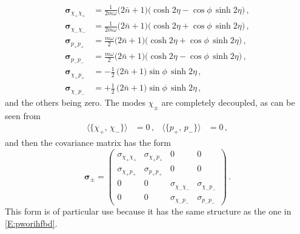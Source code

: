 \documentclass[11pt,a4paper]{article}
\begin{document}
\begin{align}
	\bm{\sigma}_{\chi_+\chi_+}&=\frac{1}{2m\omega}\bigl(2\bar{n}+1\bigr)\bigl(\cosh2\eta-\cos\phi\,\sinh2\eta\bigr)\,,\label{E:ikgbidehs1}\\
	\bm{\sigma}_{\chi_-\chi_-}&=\frac{1}{2m\omega}\bigl(2\bar{n}+1\bigr)\bigl(\cosh2\eta+\cos\phi\,\sinh2\eta\bigr)\,,\\
	\bm{\sigma}_{p_+p_+}&=\frac{m\omega}{2}\bigl(2\bar{n}+1\bigr)\bigl(\cosh2\eta+\cos\phi\,\sinh2\eta\bigr)\,,\\
	\bm{\sigma}_{p_-p_-}&=\frac{m\omega}{2}\bigl(2\bar{n}+1\bigr)\bigl(\cosh2\eta-\cos\phi\,\sinh2\eta\bigr)\,,\\
	\bm{\sigma}_{\chi_+p_+}&=-\frac{1}{2}\,\bigl(2\bar{n}+1\bigr)\sin\phi\,\sinh2\eta\,,\\
	\bm{\sigma}_{\chi_-p_-}&=+\frac{1}{2}\,\bigl(2\bar{n}+1\bigr)\sin\phi\,\sinh2\eta\,,\label{E:ikgbidehs10}
\end{align}
and the others being zero. The modes $\chi_{\pm}$ are completely decoupled, as can be seen from
\begin{align}
	\langle\bigl\{\chi_{+},\,\chi_{-}\bigr\}\rangle&=0\,,&\langle\bigl\{p_{+},\,p_{-}\bigr\}\rangle&=0\,,
\end{align}
and then the covariance matrix has the form
\begin{equation}\label{E:bskads}
	\bm{\sigma}_{\pm}=\begin{pmatrix}\sigma_{\chi_{+}\chi_{+}} &\sigma_{\chi_{+}p_{+}} &0 &0\\[4pt] \sigma_{\chi_{+}p_{+}} &\sigma_{p_{+}p_{+}} &0 &0\\[4pt] 0 &0 &\sigma_{\chi_{-}\chi_{-}} &\sigma_{\chi_{-}p_{-}}\\[4pt] 0 &0 &\sigma_{\chi_{-}p_{-}} &\sigma_{p_{-}p_{-}}	\end{pmatrix}\,.
\end{equation}
This form is of particular use because it has the same structure as the one in \eqref{E:pworihfbd}. 
\end{document}
